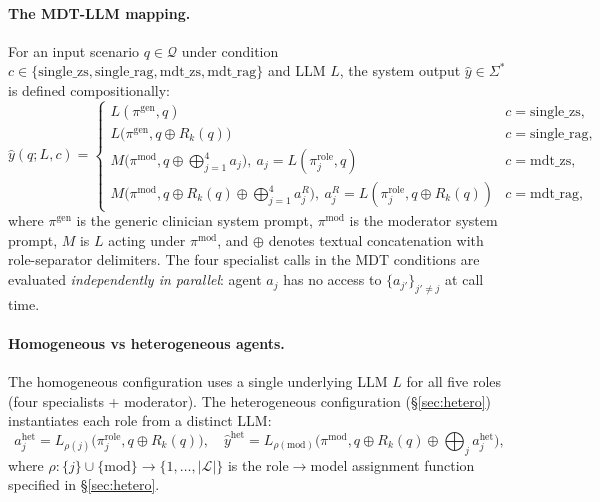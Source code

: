 \documentclass[final, 11pt, 3p]{elsarticle}
\newcommand{\MDTLLM}{\textsc{MDT-LLM}}
\begin{document}
\paragraph{The \MDTLLM{} mapping.}
For an input scenario $q \in \mathcal{Q}$ under condition $c \in \{
\text{single\_zs}, \text{single\_rag}, \text{mdt\_zs}, \text{mdt\_rag}\}$
and LLM $L$, the system output $\hat y \in \Sigma^{*}$ is defined
compositionally:
\begin{equation}
\hat y(q; L, c) =
\begin{cases}
L(\pi^{\text{gen}}, q) & c = \text{single\_zs}, \\[2pt]
L\bigl(\pi^{\text{gen}}, q \oplus R_k(q)\bigr) & c = \text{single\_rag}, \\[2pt]
M\bigl(\pi^{\text{mod}}, q \oplus \bigoplus_{j=1}^{4} a_j\bigr),\ a_j = L(\pi_j^{\text{role}}, q) & c = \text{mdt\_zs}, \\[2pt]
M\bigl(\pi^{\text{mod}}, q \oplus R_k(q) \oplus \bigoplus_{j=1}^{4} a_j^{R}\bigr),\ a_j^{R} = L(\pi_j^{\text{role}}, q \oplus R_k(q)) & c = \text{mdt\_rag},
\end{cases}
\label{eq:framework}
\end{equation}
where $\pi^{\text{gen}}$ is the generic clinician system prompt,
$\pi^{\text{mod}}$ is the moderator system prompt, $M$ is $L$ acting
under $\pi^{\text{mod}}$, and $\oplus$ denotes textual concatenation
with role-separator delimiters. The four specialist calls in the MDT
conditions are evaluated \emph{independently in parallel}: agent $a_j$
has no access to $\{a_{j'}\}_{j' \neq j}$ at call time.

\paragraph{Homogeneous vs heterogeneous agents.} The homogeneous
configuration uses a single underlying LLM $L$ for all five roles (four
specialists + moderator). The heterogeneous configuration
(\S\ref{sec:hetero}) instantiates each role from a distinct LLM:
\begin{equation}
a_j^{\mathrm{het}} = L_{\rho(j)}\bigl(\pi_j^{\text{role}}, q \oplus R_k(q)\bigr),\quad
\hat y^{\mathrm{het}} = L_{\rho(\mathrm{mod})}\bigl(\pi^{\text{mod}}, q \oplus R_k(q) \oplus \bigoplus_j a_j^{\mathrm{het}}\bigr),
\label{eq:hetero}
\end{equation}
where $\rho : \{j\} \cup \{\mathrm{mod}\} \to \{1, \ldots, |\mathcal{L}|\}$
is the role$\to$model assignment function specified in
\S\ref{sec:hetero}.
\end{document}
